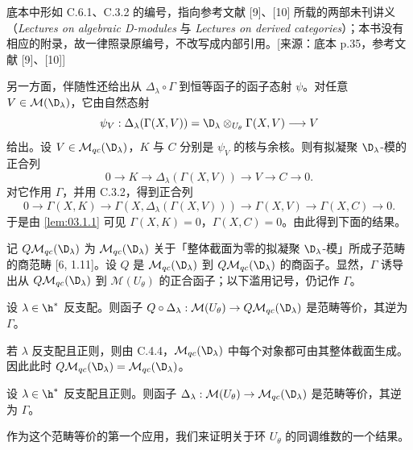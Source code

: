 \begin{annote}
底本中形如 C.6.1、C.3.2 的编号，指向参考文献 [9]、[10] 所载的两部未刊讲义（\emph{Lectures on algebraic D-modules} 与 \emph{Lectures on derived categories}）；本书没有相应的附录，故一律照录原编号，不改写成内部引用。[来源：底本 p.35，参考文献 [9]、[10]]
\end{annote}

另一方面，伴随性还给出从 $\Delta_\lambda\circ\Gamma$ 到恒等函子的函子态射 $\psi$。对任意 $V\in\mathcal{M}(\D_\lambda)$，它由自然态射
$$\psi_V:\Delta_\lambda(\Gamma(X,V))=\D_\lambda\otimes_{U_\theta}\Gamma(X,V)\longrightarrow V$$
给出。设 $V\in\mathcal{M}_{qc}(\D_\lambda)$，$K$ 与 $C$ 分别是 $\psi_V$ 的核与余核。则有拟凝聚 $\D_\lambda$-模的正合列
$$0\longrightarrow K\longrightarrow\Delta_\lambda(\Gamma(X,V))\longrightarrow V\longrightarrow C\longrightarrow 0.$$
对它作用 $\Gamma$，并用 C.3.2，得到正合列
$$0\longrightarrow\Gamma(X,K)\longrightarrow\Gamma(X,\Delta_\lambda(\Gamma(X,V)))\longrightarrow\Gamma(X,V)\longrightarrow\Gamma(X,C)\longrightarrow 0.$$
于是由 \ref{lem:03.1.1} 可见 $\Gamma(X,K)=0$，$\Gamma(X,C)=0$。由此得到下面的结果。

记 $Q\mathcal{M}_{qc}(\D_\lambda)$ 为 $\mathcal{M}_{qc}(\D_\lambda)$ 关于「整体截面为零的拟凝聚 $\D_\lambda$-模」所成子范畴的商范畴 [6, 1.11]。设 $Q$ 是 $\mathcal{M}_{qc}(\D_\lambda)$ 到 $Q\mathcal{M}_{qc}(\D_\lambda)$ 的商函子。显然，$\Gamma$ 诱导出从 $Q\mathcal{M}_{qc}(\D_\lambda)$ 到 $\mathcal{M}(U_\theta)$ 的正合函子；以下滥用记号，仍记作 $\Gamma$。

\begin{theorem}\label{thm:03.1.2}
设 $\lambda\in\h^*$ 反支配。则函子 $Q\circ\Delta_\lambda:\mathcal{M}(U_\theta)\to Q\mathcal{M}_{qc}(\D_\lambda)$ 是范畴等价，其逆为 $\Gamma$。
\end{theorem}

若 $\lambda$ 反支配且正则，则由 C.4.4，$\mathcal{M}_{qc}(\D_\lambda)$ 中每个对象都可由其整体截面生成。因此此时 $Q\mathcal{M}_{qc}(\D_\lambda)=\mathcal{M}_{qc}(\D_\lambda)$。

\begin{corollary}\label{cor:03.1.3}
设 $\lambda\in\h^*$ 反支配且正则。则函子 $\Delta_\lambda:\mathcal{M}(U_\theta)\to\mathcal{M}_{qc}(\D_\lambda)$ 是范畴等价，其逆为 $\Gamma$。
\end{corollary}

作为这个范畴等价的第一个应用，我们来证明关于环 $U_\theta$ 的同调维数的一个结果。

